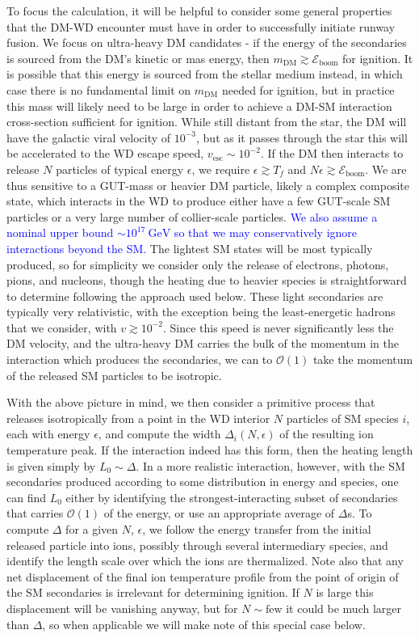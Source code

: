 \documentclass[twocolumn,showpacs,preprintnumbers,amsmath,amssymb,prd]{revtex4}
\newcommand{\Eboom}{\mathcal{E}_\text{boom}}
\newcommand{\OO}{\mathcal{O}}
\newcommand{\GeV}{\text{GeV}}
\begin{document}
To focus the calculation, it will be helpful to consider some general properties that the DM-WD encounter must have in order to successfully initiate runway fusion.
We focus on ultra-heavy DM candidates - if the energy of the secondaries is sourced from the DM's kinetic or mas energy, then $m_\text{DM} \gtrsim \Eboom$ for ignition. 
It is possible that this energy is sourced from the stellar medium instead, in which case there is no fundamental limit on $m_\text{DM}$ needed for ignition, but in practice this mass will likely need to be large in order to achieve a DM-SM interaction cross-section sufficient for ignition.
While still distant from the star, the DM will have the galactic viral velocity of $10^{-3}$, but as it passes through the star this will be accelerated to the WD escape speed, $v_\text{esc} \sim 10^{-2}$.
If the DM then interacts to release $N$ particles of typical energy $\epsilon$, we require $\epsilon \gtrsim T_f$ and $N \epsilon \gtrsim \Eboom$.
We are thus sensitive to a GUT-mass or heavier DM particle, likely a complex composite state, which interacts in the WD to produce either have a few GUT-scale SM particles or a very large number of collier-scale particles. 
\textcolor{blue}{We also assume a nominal upper bound $\sim 10^{17} ~\GeV$ so that we may conservatively ignore interactions beyond the SM.} 
The lightest SM states will be most typically produced, so for simplicity we consider only the release of electrons, photons, pions, and nucleons, though the heating due to heavier species is straightforward to determine following the approach used below.
These light secondaries are typically very relativistic, with the exception being the least-energetic hadrons that we consider, with $v \gtrsim 10^{-2}$.
Since this speed is never significantly less the DM velocity, and the ultra-heavy DM carries the bulk of the momentum in the interaction which produces the secondaries, we can to $\OO(1)$ take the momentum of the released SM particles to be isotropic. 

With the above picture in mind, we then consider a primitive process that releases isotropically from a point in the WD interior $N$ particles of SM species $i$, each with energy $\epsilon$, and compute the width $\Delta_i(N, \epsilon)$ of the resulting ion temperature peak. 
If the interaction indeed has this form, then the heating length is given simply by $L_0 \sim \Delta$. 
In a more realistic interaction, however, with the SM secondaries produced according to some distribution in energy and species, one can find $L_0$ either by identifying the strongest-interacting subset of secondaries that carries $\OO(1)$ of the energy, or use an appropriate average of $\Delta$s. 
To compute $\Delta$ for a given $N$, $\epsilon$, we follow the energy transfer from the initial released particle into ions, possibly through several intermediary species, and identify the length scale over which the ions are thermalized.
Note also that any net displacement of the final ion temperature profile from the point of origin of the SM secondaries is irrelevant for determining ignition. 
If $N$ is large this displacement will be vanishing anyway, but for $N \sim \text{few}$ it could be much larger than $\Delta$, so when applicable we will make note of this special case below. 
\end{document}
